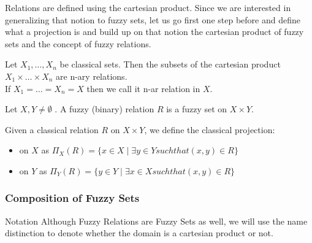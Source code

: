 Relations are defined using the cartesian product. Since we are interested in generalizing that notion to fuzzy sets, let us go first one step before and define what a projection is and build up on that notion the cartesian product of fuzzy sets and the concept of fuzzy relations.

\begin{definition*}
    Let $X_1, \dots , X_n$ be classical sets. Then the subsets of the cartesian product $X_1\times \dots \times X_n$ are n-ary relations. \\
    If $X_1=\dots = X_n = X$ then we call it n-ar relation in $X$.
\end{definition*}

\begin{definition}
  Let $X,Y \neq \emptyset$ . A fuzzy (binary) relation $R$ is a fuzzy set on $X \times Y$.
\end{definition}


\begin{definition*}
  Given a classical relation $R$ on $X \times Y$, we define the classical projection:
  \begin{itemize}
    \item on $X$ as $\Pi_X(R)=\{x \in X \mid \exists y \in Y such that (x,y) \in R\}$
    \item on $Y$ as $\Pi_Y(R)=\{y \in Y \mid \exists x \in X such that (x,y) \in R\}$
  \end{itemize}

\end{definition*}

\begin{definition}

\end{definition}

\begin{definition}

\end{definition}

\subsubsection*{Composition of Fuzzy Sets}
\begin{notation}[label={not:compositionFS}]{Notation}
    Although Fuzzy Relations are Fuzzy Sets as well, we will use the name distinction to denote whether the domain is a cartesian product or not.
  \end{notation}
\begin{definition}
    
\end{definition}

\begin{definition}
    
\end{definition}